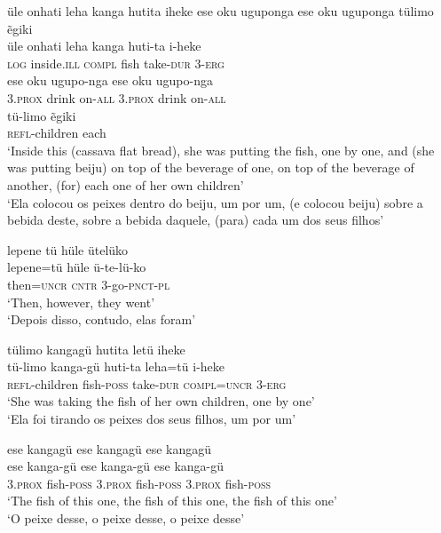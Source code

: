 \documentclass[output=paper,
modfonts,nonflat
]{langsci/langscibook}
\begin{document}
\ea üle onhati leha kanga hutita iheke ese oku uguponga ese oku uguponga tülimo ẽgiki{\footnotemark}{} \\ [.6em]
\gll üle	onhati 		leha		kanga	huti-ta	i-heke  \\
\textsc{log} 	inside.\textsc{ill} 	\textsc{compl} 	fish 	take\textsc{-dur} 	\textsc{3-erg}  \\
\gll ese 		oku	ugupo-nga	ese 		oku 	ugupo-nga \\		  
3\textsc{.prox}	drink 	on-\textsc{all} 	\textsc{3.prox}	drink 	on\textsc{-all}   \\
\gll tü-limo			ẽgiki \\
\textsc{refl}-children	 each  \\
\glt ‘Inside this (cassava flat bread), she was putting the fish, one by one, and (she was putting beiju) on top of the beverage of one, on top of the beverage of another, (for) each one of her own children’ \\
‘Ela colocou os peixes dentro do beiju, um por um, (e colocou beiju) sobre a bebida deste, sobre a bebida daquele, (para) cada um dos seus filhos’ \\
\z

\largerpage[2]
\ea lepene tü hüle ütelüko \\[.3em]
\gll lepene=tü	hüle 	ü-te-lü-ko \\
then=\textsc{uncr} 	\textsc{cntr} 	3-go\textsc{-pnct-pl}	 \\
\glt ‘Then, however, they went’ \\
‘Depois disso, contudo, elas foram’ \\
\z


\ea tülimo kangagü hutita letü iheke \\[.3em]
\gll tü-limo			kanga-gü	huti-ta		leha=tü		i-heke \\
\textsc{refl}-children	fish-\textsc{poss} 	take-\textsc{dur} 	\textsc{compl=uncr} 	\textsc{3-erg} \\
\glt‘She was taking the fish of her own children, one by one’ \\
‘Ela foi tirando os peixes dos seus filhos, um por um’ \\
\z


\ea ese kangagü ese kangagü ese kangagü \\[.3em]
\gll ese kanga-gü		ese kanga-gü		ese kanga-gü \\
\textsc{3.prox} fish-\textsc{poss} 	\textsc{3.prox} fish-\textsc{poss}	\textsc{3.prox} fish\textsc{-poss} \\
\glt‘The fish of this one, the fish of this one, the fish of this one’ \\
‘O peixe desse, o peixe desse, o peixe desse’ \\
\z
\end{document}
